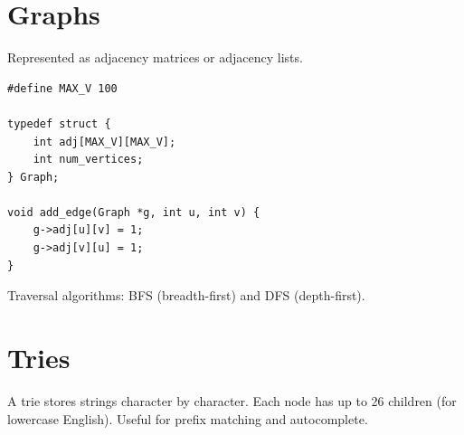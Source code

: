 \documentclass[11pt,a4paper]{article}
\begin{document}
\section{Graphs}
Represented as adjacency matrices or adjacency lists.
\begin{lstlisting}
#define MAX_V 100

typedef struct {
    int adj[MAX_V][MAX_V];
    int num_vertices;
} Graph;

void add_edge(Graph *g, int u, int v) {
    g->adj[u][v] = 1;
    g->adj[v][u] = 1;
}
\end{lstlisting}

Traversal algorithms: BFS (breadth-first) and DFS (depth-first).

\section{Tries}
A trie stores strings character by character. Each node has up to 26 children
(for lowercase English). Useful for prefix matching and autocomplete.
\end{document}
